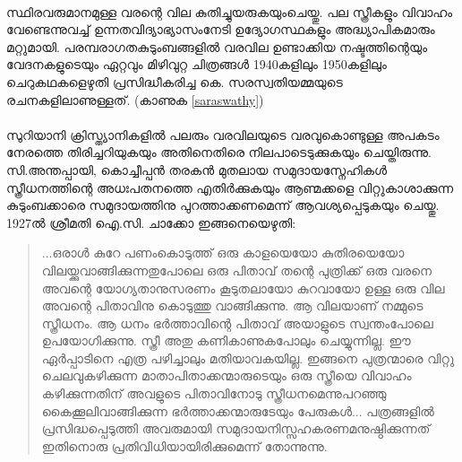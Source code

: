 \paragraph{}സ്ഥിരവരുമാനമുള്ള വരന്റെ വില കുതിച്ചുയരുകയുംചെയ്തു. പല സ്ത്രീകളും വിവാഹം വേണ്ടെന്നുവച്ച് ഉന്നതവിദ്യാഭ്യാസംനേടി ഉദ്യോഗസ്ഥകളും അദ്ധ്യാപികമാരും മറ്റുമായി. പരമ്പരാഗതകുടുംബങ്ങളിൽ വരവില ഉണ്ടാക്കിയ നഷ്ടത്തിന്റെയും വേദനകളുടെയും ഏറ്റവും മിഴിവുറ്റ ചിത്രങ്ങൾ 1940കളിലും 1950കളിലും ചെറുകഥകളെഴുതി പ്രസിദ്ധീകരിച്ച കെ. സരസ്വതിയമ്മയുടെ രചനകളിലാണുള്ളത്. (കാണുക \ref{saraswathy})

\paragraph{}
 സുറിയാനി ക്രിസ്ത്യാനികളിൽ പലരും വരവിലയുടെ വരവുകൊണ്ടുള്ള അപകടം നേരത്തെ തിരിച്ചറിയുകയും അതിനെതിരെ നിലപാടെടുക്കുകയും ചെയ്തിരുന്നു. സി.അന്തപ്പായി, കൊച്ചീപ്പൻ തരകൻ മുതലായ സമുദായസ്നേഹികൾ സ്ത്രീധനത്തിന്റെ അധഃപതനത്തെ എതിർക്കുകയും ആണ്മക്കളെ വിറ്റുകാശാക്കുന്ന കുടുംബക്കാരെ സമുദായത്തിനു പുറത്താക്കണമെന്ന് ആവശ്യപ്പെടുകയും ചെയ്തു. 1927ൽ ശ്രീമതി ഐ.സി. ചാക്കോ ഇങ്ങനെയെഴുതി:

\begin{quotation}
...ഒരാൾ കുറേ പണംകൊടുത്ത് ഒരു കാളയെയോ കുതിരയെയോ വിലയ്ക്കുവാങ്ങിക്കുന്നതുപോലെ ഒരു പിതാവ് തന്റെ പുത്രിക്ക് ഒരു വരനെ അവന്റെ യോഗ്യതാനുസരണം കൂടുതലായോ കുറവായോ ഉള്ള ഒരു വില അവന്റെ പിതാവിനു കൊടുത്തു വാങ്ങിക്കുന്നു. ആ വിലയാണ് നമ്മുടെ സ്ത്രീധനം. ആ ധനം ഭർത്താവിന്റെ പിതാവ് അയാളുടെ സ്വന്തംപോലെ ഉപയോഗിക്കുന്നു. സ്ത്രീ അതു കണികാണുകപോലും ചെയ്യുന്നില്ല. ഈ ഏർപ്പാടിനെ എത്ര പഴിച്ചാലും മതിയാവകയില്ല. ഇങ്ങനെ പുത്രന്മാരെ വിറ്റു ചെലവുകഴിക്കുന്ന മാതാപിതാക്കന്മാരുടെയും ഒരു സ്ത്രീയെ വിവാഹം കഴിക്കുന്നതിന് അവളുടെ പിതാവിനോടു സ്ത്രീധനമെന്നുപറഞ്ഞു കൈക്കൂലിവാങ്ങിക്കുന്ന ഭർത്താക്കന്മാരുടേയും പേരുകൾ... പത്രങ്ങളിൽ പ്രസിദ്ധപ്പെടുത്തി അവരുമായി സമുദായനിസ്സഹകരണമനുഷ്ഠിക്കുന്നത് ഇതിനൊരു പ്രതിവിധിയായിരിക്കുമെന്ന് തോന്നുന്നു.
\end{quotation}

